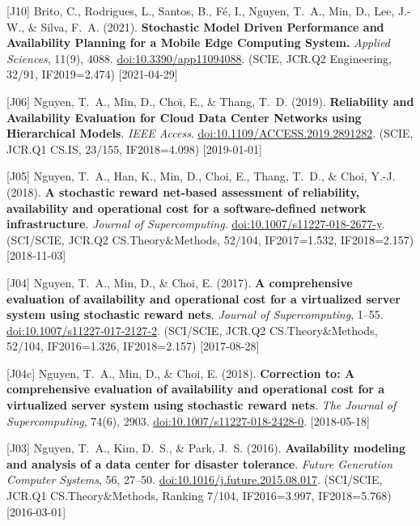 {\begin{pubenumerate}
\item {\color{blue}[J10]} Brito, C., Rodrigues, L., Santos, B., F\'e, I., Nguyen, T.\ A., Min, D., Lee, J.-W., \& Silva, F.\ A. (2021). \textbf{Stochastic Model Driven Performance and Availability Planning for a Mobile Edge Computing System.} \textit{Applied Sciences}, 11(9), 4088. \href{https://doi.org/10.3390/app11094088}{doi:10.3390/app11094088}. (SCIE, JCR.Q2 Engineering, 32/91, IF2019=2.474) [2021-04-29]

\item {\color{blue}[J06]} Nguyen, T.\ A., Min, D., Choi, E., \& Thang, T.\ D. (2019). \textbf{Reliability and Availability Evaluation for Cloud Data Center Networks using Hierarchical Models}. \textit{IEEE Access}. \href{https://doi.org/10.1109/ACCESS.2019.2891282}{doi:10.1109/ACCESS.2019.2891282}. (SCIE, JCR.Q1 CS.IS, 23/155, IF2018=4.098) [2019-01-01]

\item {\color{blue}[J05]} Nguyen, T.\ A., Han, K., Min, D., Choi, E., Thang, T.\ D., \& Choi, Y.-J. (2018). \textbf{A stochastic reward net-based assessment of reliability, availability and operational cost for a software-defined network infrastructure}. \textit{Journal of Supercomputing}. \href{https://doi.org/10.1007/s11227-018-2677-y}{doi:10.1007/s11227-018-2677-y}. (SCI/SCIE, JCR.Q2 CS.Theory\&Methods, 52/104, IF2017=1.532, IF2018=2.157) [2018-11-03]

\item {\color{blue}[J04]} Nguyen, T.\ A., Min, D., \& Choi, E. (2017). \textbf{A comprehensive evaluation of availability and operational cost for a virtualized server system using stochastic reward nets}. \textit{Journal of Supercomputing}, 1--55. \href{https://link.springer.com/article/10.1007/s11227-017-2127-2}{doi:10.1007/s11227-017-2127-2}. (SCI/SCIE, JCR.Q2 CS.Theory\&Methods, 52/104, IF2016=1.326, IF2018=2.157) [2017-08-28]

\item {\color{blue}[J04c]} Nguyen, T.\ A., Min, D., \& Choi, E. (2018). \textbf{Correction to: A comprehensive evaluation of availability and operational cost for a virtualized server system using stochastic reward nets}. \textit{The Journal of Supercomputing}, 74(6), 2903. \href{https://doi.org/10.1007/s11227-018-2428-0}{doi:10.1007/s11227-018-2428-0}. [2018-05-18]

\item {\color{blue}[J03]} Nguyen, T.\ A., Kim, D.\ S., \& Park, J.\ S. (2016). \textbf{Availability modeling and analysis of a data center for disaster tolerance}. \textit{Future Generation Computer Systems}, 56, 27--50. \href{https://doi.org/10.1016/j.future.2015.08.017}{doi:10.1016/j.future.2015.08.017}. (SCI/SCIE, JCR.Q1 CS.Theory\&Methods, Ranking 7/104, IF2016=3.997, IF2018=5.768) [2016-03-01]


\end{pubenumerate}}
